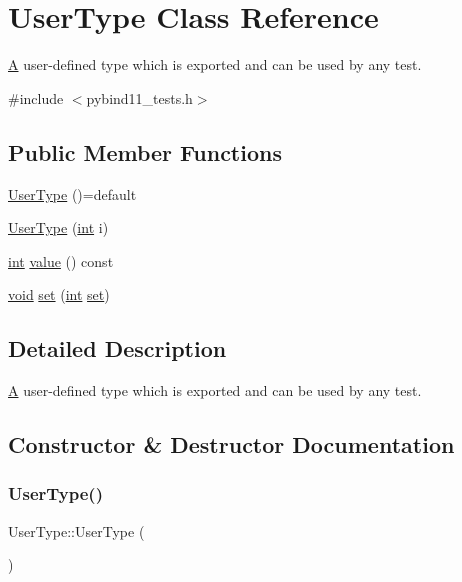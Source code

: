\hypertarget{class_user_type}{}\section{User\+Type Class Reference}
\label{class_user_type}


\mbox{\hyperlink{struct_a}{A}} user-\/defined type which is exported and can be used by any test.  




{\ttfamily \#include $<$pybind11\+\_\+tests.\+h$>$}

\subsection*{Public Member Functions}
\begin{DoxyCompactItemize}
\item 
\mbox{\hyperlink{class_user_type_a07d95c5b9030ed58983e95b53d3cfbc1}{User\+Type}} ()=default
\item 
\mbox{\hyperlink{class_user_type_aa61d8a4462ac6fe39a0cfc85ee93b19a}{User\+Type}} (\mbox{\hyperlink{warnings_8h_a74f207b5aa4ba51c3a2ad59b219a423b}{int}} i)
\item 
\mbox{\hyperlink{warnings_8h_a74f207b5aa4ba51c3a2ad59b219a423b}{int}} \mbox{\hyperlink{class_user_type_a75d36252b67fa6a4947a8bdefa6e19b3}{value}} () const
\item 
\mbox{\hyperlink{_s_d_l__opengles2__gl2ext_8h_ae5d8fa23ad07c48bb609509eae494c95}{void}} \mbox{\hyperlink{class_user_type_a38dbad5273d94b067e9fe781d7e1f240}{set}} (\mbox{\hyperlink{warnings_8h_a74f207b5aa4ba51c3a2ad59b219a423b}{int}} \mbox{\hyperlink{classset}{set}})
\end{DoxyCompactItemize}


\subsection{Detailed Description}
\mbox{\hyperlink{struct_a}{A}} user-\/defined type which is exported and can be used by any test. 

\subsection{Constructor \& Destructor Documentation}
\mbox{\label{class_user_type_a07d95c5b9030ed58983e95b53d3cfbc1}} 
\subsubsection{\texorpdfstring{UserType()}{UserType()}\hspace{0.1cm}{\footnotesize\ttfamily [1/2]}}
{\footnotesize\ttfamily User\+Type\+::\+User\+Type (\begin{DoxyParamCaption}{ }\end{DoxyParamCaption})\hspace{0.3cm}{\ttfamily [default]}}


